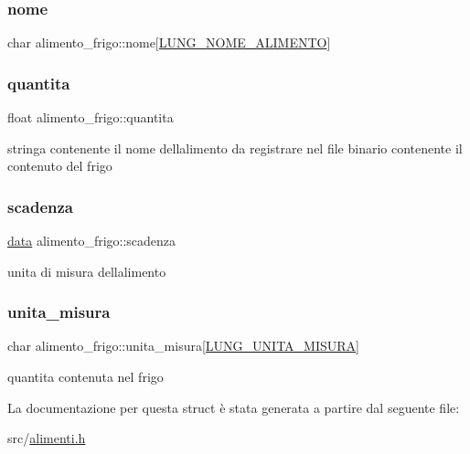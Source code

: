 \subsubsection{\texorpdfstring{nome}{nome}}
{\footnotesize\ttfamily char alimento\+\_\+frigo\+::nome\mbox{[}\hyperlink{alimenti_8h_af503a16b1a63b47d6a5b2edd94b5caf2}{L\+U\+N\+G\+\_\+\+N\+O\+M\+E\+\_\+\+A\+L\+I\+M\+E\+N\+TO}\mbox{]}}

\mbox{\label{structalimento__frigo_a779484a556c1d08624a6d6db4fcd37e7}} 
\subsubsection{\texorpdfstring{quantita}{quantita}}
{\footnotesize\ttfamily float alimento\+\_\+frigo\+::quantita}



stringa contenente il nome dell\textquotesingle{}alimento da registrare nel file binario contenente il contenuto del frigo 

\mbox{\label{structalimento__frigo_a87cbbe37d01409e7006a9eb203bc6263}} 
\subsubsection{\texorpdfstring{scadenza}{scadenza}}
{\footnotesize\ttfamily \hyperlink{structdata}{data} alimento\+\_\+frigo\+::scadenza}



unita di misura dell\textquotesingle{}alimento 

\mbox{\label{structalimento__frigo_ae2ab4650f20280f28006aff3616952c6}} 
\subsubsection{\texorpdfstring{unita\+\_\+misura}{unita\_misura}}
{\footnotesize\ttfamily char alimento\+\_\+frigo\+::unita\+\_\+misura\mbox{[}\hyperlink{alimenti_8h_ade0f1f034a3ec6c04b8e29f4730db983}{L\+U\+N\+G\+\_\+\+U\+N\+I\+T\+A\+\_\+\+M\+I\+S\+U\+RA}\mbox{]}}



quantita contenuta nel frigo 



La documentazione per questa struct è stata generata a partire dal seguente file\+:\begin{DoxyCompactItemize}
\item 
src/\hyperlink{alimenti_8h}{alimenti.\+h}\end{DoxyCompactItemize}
